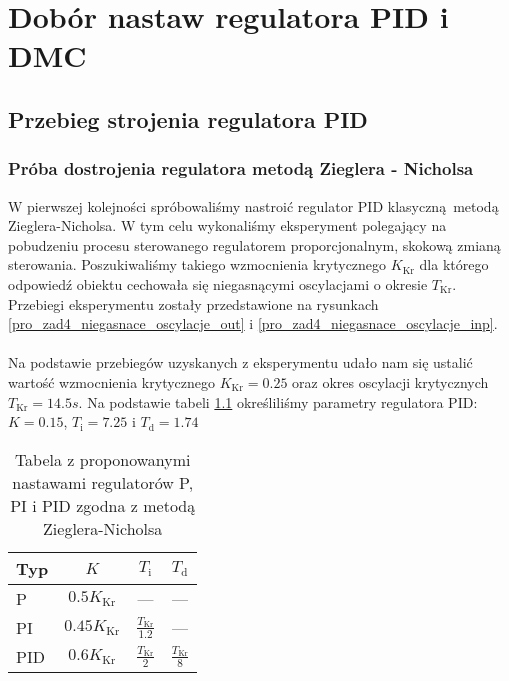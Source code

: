 \chapter{Dobór nastaw regulatora PID i DMC}
\label{pro4}

\section{Przebieg strojenia regulatora PID}
\label{pro4_PID}

\subsection{Próba dostrojenia regulatora metodą Zieglera - Nicholsa}
\label{pro4_PID_ZN}
W pierwszej kolejności spróbowaliśmy nastroić regulator PID klasyczną metodą Zieglera-Nicholsa.
W tym celu wykonaliśmy eksperyment polegający na pobudzeniu procesu sterowanego regulatorem 
proporcjonalnym, skokową zmianą sterowania. Poszukiwaliśmy takiego wzmocnienia krytycznego
$K_{\mathrm{Kr}}$ dla którego odpowiedź obiektu cechowała się niegasnącymi oscylacjami o 
okresie $T_{\mathrm{Kr}}$. Przebiegi eksperymentu zostały przedstawione na rysunkach 
\ref{pro_zad4_niegasnace_oscylacje_out} i \ref{pro_zad4_niegasnace_oscylacje_inp}.\\
\\
\indent Na podstawie przebiegów uzyskanych z eksperymentu udało nam się ustalić wartość wzmocnienia 
krytycznego $K_{\mathrm{Kr}} = \num{0,25}$ oraz okres oscylacji krytycznych $T_{\mathrm{Kr}} =
\num{14.5}s$. Na podstawie tabeli \ref{pro4_tabela_ZN} określiliśmy parametry regulatora PID:
$K = \num{0.15}$, $T_{\mathrm{i}} = \num{7.25}$ i $T_{\mathrm{d}} = \num{1.74}$

\begin{table}[h]
    \centering
    \begin{tabular}{|l|c|c|c|}
    \hline
    Typ & $K$ & $T_{\mathrm{i}}$ & $T_{\mathrm{d}}$ \\ \hline
    P   & $\num{0.5}K_{\mathrm{Kr}}$ & --- & --- \\
    PI  & $\num{0.45}K_{\mathrm{Kr}}$ & $\frac{T_{\mathrm{Kr}}}{\num{1.2}}$ & --- \\
    PID & $\num{0.6}K_{\mathrm{Kr}}$ & $\frac{T_{\mathrm{Kr}}}{\num{2}}$ & $\frac{T_{\mathrm{Kr}}}{\num{8}}$ \\ \hline
    \end{tabular}
    \caption{Tabela z proponowanymi nastawami regulatorów P, PI i PID zgodna z metodą Zieglera-Nicholsa}
    \label{pro4_tabela_ZN}
\end{table}

